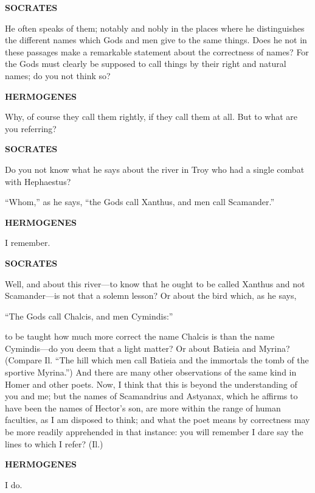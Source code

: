 \documentclass[11pt,letter]{article}
\begin{document}
\par \textbf{SOCRATES}
\par   He often speaks of them; notably and nobly in the places where he distinguishes the different names which Gods and men give to the same things. Does he not in these passages make a remarkable statement about the correctness of names? For the Gods must clearly be supposed to call things by their right and natural names; do you not think so?

\par \textbf{HERMOGENES}
\par   Why, of course they call them rightly, if they call them at all. But to what are you referring?

\par \textbf{SOCRATES}
\par   Do you not know what he says about the river in Troy who had a single combat with Hephaestus?

\par  “Whom,” as he says, “the Gods call Xanthus, and men call Scamander.”

\par \textbf{HERMOGENES}
\par   I remember.

\par \textbf{SOCRATES}
\par   Well, and about this river—to know that he ought to be called Xanthus and not Scamander—is not that a solemn lesson? Or about the bird which, as he says,

\par  “The Gods call Chalcis, and men Cymindis:”

\par  to be taught how much more correct the name Chalcis is than the name Cymindis—do you deem that a light matter? Or about Batieia and Myrina? (Compare Il. “The hill which men call Batieia and the immortals the tomb of the sportive Myrina.”) And there are many other observations of the same kind in Homer and other poets. Now, I think that this is beyond the understanding of you and me; but the names of Scamandrius and Astyanax, which he affirms to have been the names of Hector’s son, are more within the range of human faculties, as I am disposed to think; and what the poet means by correctness may be more readily apprehended in that instance: you will remember I dare say the lines to which I refer? (Il.)

\par \textbf{HERMOGENES}
\par   I do.
\end{document}
